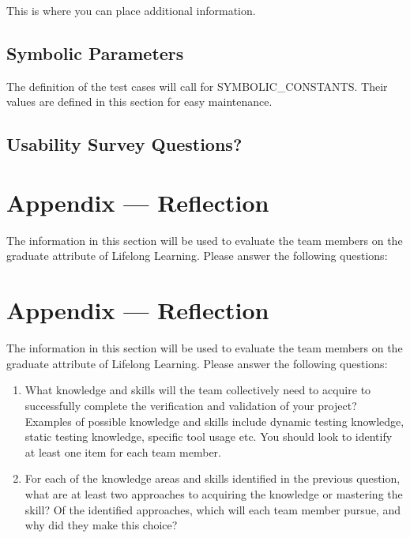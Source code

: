 \documentclass[12pt, titlepage]{article}
\begin{document}
This is where you can place additional information.

\subsection{Symbolic Parameters}

The definition of the test cases will call for SYMBOLIC\_CONSTANTS.
Their values are defined in this section for easy maintenance.

\subsection{Usability Survey Questions?}


\newpage{}
\section*{Appendix --- Reflection}

The information in this section will be used to evaluate the team members on the
graduate attribute of Lifelong Learning.  Please answer the following questions:

\newpage{}
\section*{Appendix --- Reflection}

The information in this section will be used to evaluate the team members on the
graduate attribute of Lifelong Learning.  Please answer the following questions:

\begin{enumerate}
  \item What knowledge and skills will the team collectively need to acquire to
  successfully complete the verification and validation of your project?
  Examples of possible knowledge and skills include dynamic testing knowledge,
  static testing knowledge, specific tool usage etc.  You should look to
  identify at least one item for each team member.
  \item For each of the knowledge areas and skills identified in the previous
  question, what are at least two approaches to acquiring the knowledge or
  mastering the skill?  Of the identified approaches, which will each team
  member pursue, and why did they make this choice?
\end{enumerate}
\end{document}

